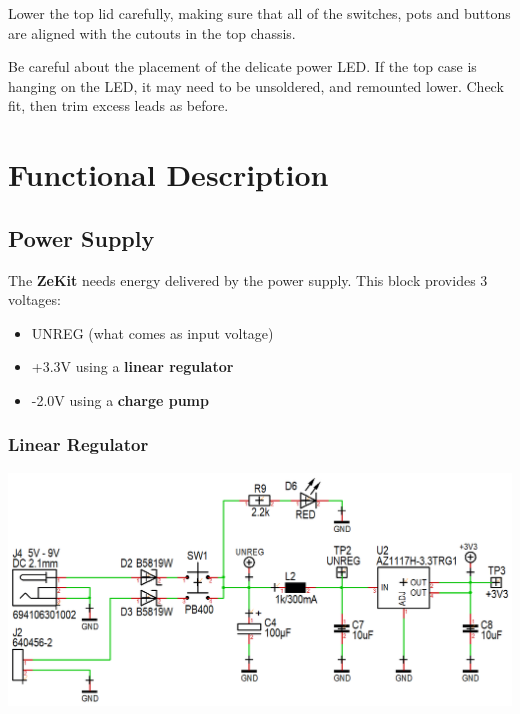 \documentclass{scrartcl}
\begin{document}
Lower the top lid carefully, making sure that all of the switches, pots and buttons are aligned with the cutouts in the top chassis.

Be careful about the placement of the delicate power LED. If the top case is hanging on the LED, it may need to be unsoldered, and remounted lower. Check fit, then trim excess leads as before.


\pagebreak

\section{Functional Description}

\subsection{Power Supply}

The \textbf{ZeKit} needs energy delivered by the power supply. This block provides 3 voltages:
\begin{itemize}
    \item UNREG (what comes as input voltage)
    \item +3.3V using a \textbf{linear regulator}
    \item -2.0V using a \textbf{charge pump}
\end{itemize}

\subsubsection{Linear Regulator}

\vspace{-0.25cm}
\begin{center}
    \includegraphics[scale=0.42]{assets/schema-power.png}
\end{center}
\end{document}
